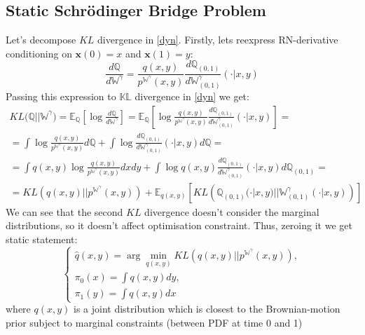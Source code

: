 \documentclass{article}
\begin{document}
\subsection{Static Schrödinger Bridge Problem}
Let's decompose $KL$ divergence in \ref{dyn}. Firstly, lets reexpress RN-derivative conditioning on $\textbf{x}(0)=x$ and $\textbf{x}(1)=y$:
$$
\frac{d\mathbb{Q}}{d\mathbb{W}^\gamma} = \frac{q(x, y)}{p^{\mathbb{W}^\gamma}(x, y)}\frac{d\mathbb{Q}_{(0,1)}}{d\mathbb{W}^\gamma_{(0,1)}}(\cdot|x,y)
$$
Passing this expression to $\mathbb{KL}$ divergence in \ref{dyn} we get:
\begin{equation}
    \begin{split}
        KL\mathbb{(Q||W}^\gamma) = \mathbb{E_Q}\left[\log \frac{d\mathbb{Q}}{d\mathbb{W}^\gamma}\right] = \mathbb{E_Q}\left[\log \frac{q(x, y)}{p^{\mathbb{W}^\gamma}(x, y)}\frac{d\mathbb{Q}_{(0,1)}}{d\mathbb{W}^\gamma_{(0,1)}}(\cdot|x,y)\right] = \\ = \int\log \frac{q(x, y)}{p^{\mathbb{W}^\gamma}(x, y)} d\mathbb{Q} + \int\log \frac{d\mathbb{Q}_{(0,1)}}{d\mathbb{W}^\gamma_{(0,1)}}(\cdot|x,y)d\mathbb{Q}= \\ = \int q(x, y)\log \frac{q(x, y)}{p^{\mathbb{W}^\gamma}(x, y)} dxdy + \int\log q(x, y)\frac{d\mathbb{Q}_{(0,1)}}{d\mathbb{W}^\gamma_{(0,1)}}(\cdot|x,y)d\mathbb{Q}_{(0,1)} = \\ = KL\left(q(x, y) || p^{\mathbb{W}^\gamma}(x, y)\right) + \mathbb{E}_{q(x, y)}\left[KL\left(\mathbb{Q}_{(0,1)}(\cdot|x,y) || \mathbb{W}^\gamma_{(0,1)}(\cdot|x,y)\right)\right]
    \end{split}
\end{equation}
We can see that the second $KL$ divergence doesn't consider the marginal distributions, so it doesn't affect optimisation constraint. Thus, zeroing it we get  static statement:
$$\left\{ \begin{array}{c}
\hat q(x,y) = \arg\min_{q(x,y)} KL(q(x,y)||p^{\mathbb{W}^\gamma}(x,y)), \\
\pi_0(x) = \int q(x,y)dy, \\
\pi_1(y) = \int q(x,y)dx
\end{array}\right.$$
where $q(x,y)$ is a joint distribution which is closest to the Brownian-motion prior subject to marginal constraints (between PDF at time 0 and 1)
\end{document}

